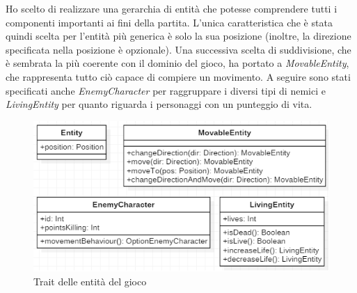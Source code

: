 Ho scelto di realizzare una gerarchia di entità che potesse comprendere tutti i componenti importanti ai fini della partita. L'unica caratteristica che è stata quindi scelta per l'entità più generica è solo la sua posizione (inoltre, la direzione specificata nella posizione è opzionale). Una successiva scelta di suddivisione, che è sembrata la più coerente con il dominio del gioco, ha portato a \textit{MovableEntity}, che rappresenta tutto ciò capace di compiere un movimento. A seguire sono stati specificati anche \textit{EnemyCharacter} per raggruppare i diversi tipi di nemici e \textit{LivingEntity} per quanto riguarda i personaggi con un punteggio di vita.

\begin{figure}[H]
  \includegraphics[width=14cm]{res/entitiesTraits.png}
  \caption{Trait delle entità del gioco}
  \label{entityTraits}
\end{figure}